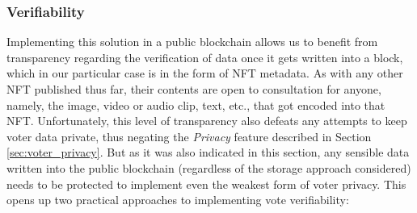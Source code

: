 \documentclass[../main.tex]{subfiles}
\begin{document}
\subsubsection{Verifiability}
\label{sec:verifiability}
Implementing this solution in a public blockchain allows us to benefit from transparency regarding the verification of data once it gets written into a block, which in our particular case is in the form of NFT metadata. As with any other NFT published thus far, their contents are open to consultation for anyone, namely, the image, video or audio clip, text, etc., that got encoded into that NFT. Unfortunately, this level of transparency also defeats any attempts to keep voter data private, thus negating the \textit{Privacy} feature described in Section \ref{sec:voter_privacy}. But as it was also indicated in this section, any sensible data written into the public blockchain (regardless of the storage approach considered) needs to be protected to implement even the weakest form of voter privacy. This opens up two practical approaches to implementing vote verifiability:
\end{document}
